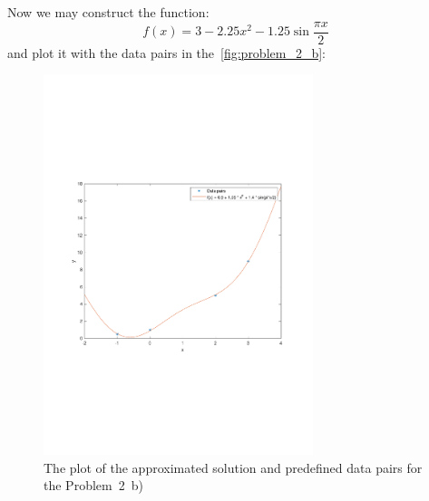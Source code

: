 Now we may construct the function:
\begin{equation*}
  f(x)=3-2.25x^2-1.25\sin{\frac{\pi{}x}{2}}
\end{equation*}
and plot it with the data pairs in the~\autoref{fig:problem_2_b}:

\begin{figure}
  \centering
  \includegraphics[width=0.7\textwidth]{images/Problem_2_b_plot.pdf}
  \caption{The plot of the approximated solution and predefined data pairs
    for the Problem~2~b)}\label{fig:problem_2_b}
\end{figure}
